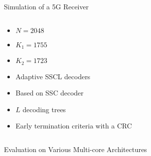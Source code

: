 \begin{frame}{Simulation of a 5G Receiver}
\begin{columns}
\begin{column}[T]{4cm}
\begin{itemize}
      \item $N = 2048$
      \item $K_1 = 1755$
      \item $K_2 = 1723$
      \vspace{0.3cm}
      \item Adaptive SSCL decoders
      \item Based on SSC decoder
      \item $L$ decoding trees
      \item Early termination criteria with a CRC
    \end{itemize}
  \end{column}
  \end{columns}
\end{frame}

\begin{frame}{Evaluation on Various Multi-core Architectures}


\end{frame}
